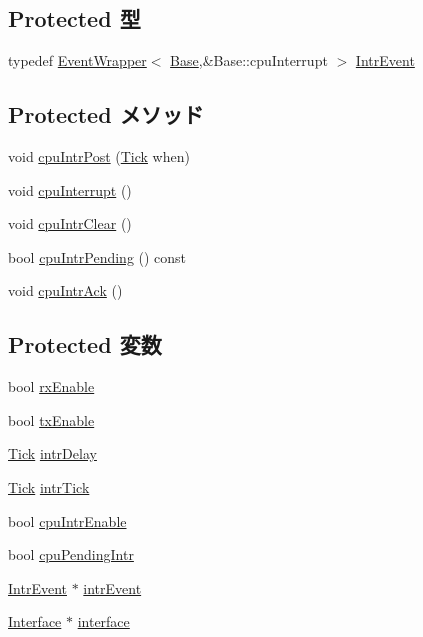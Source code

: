 \subsection*{Protected 型}
\begin{DoxyCompactItemize}
\item 
typedef \hyperlink{classEventWrapper}{EventWrapper}$<$ \hyperlink{classSinic_1_1Base}{Base},\&Base::cpuInterrupt $>$ \hyperlink{classSinic_1_1Base_a09f9d93e16b939356647836884f8f47f}{IntrEvent}
\end{DoxyCompactItemize}
\subsection*{Protected メソッド}
\begin{DoxyCompactItemize}
\item 
void \hyperlink{classSinic_1_1Base_af1fc872917f4ac5efa0d55c5c139bc9a}{cpuIntrPost} (\hyperlink{base_2types_8hh_a5c8ed81b7d238c9083e1037ba6d61643}{Tick} when)
\item 
void \hyperlink{classSinic_1_1Base_a6191ac616bb71f81aeb9a72898f5207f}{cpuInterrupt} ()
\item 
void \hyperlink{classSinic_1_1Base_ab1873826f52c78bed89f2ee53382a4c2}{cpuIntrClear} ()
\item 
bool \hyperlink{classSinic_1_1Base_a8f53e358ba260670dbc7296b35482316}{cpuIntrPending} () const 
\item 
void \hyperlink{classSinic_1_1Base_aa1dc801f063bc87ddb1cf8c618ec692e}{cpuIntrAck} ()
\end{DoxyCompactItemize}
\subsection*{Protected 変数}
\begin{DoxyCompactItemize}
\item 
bool \hyperlink{classSinic_1_1Base_a62cd12a758780749d1ed0ec4d4cfbe71}{rxEnable}
\item 
bool \hyperlink{classSinic_1_1Base_a950ab5d638f497b596eacdbf60bcb3f0}{txEnable}
\item 
\hyperlink{base_2types_8hh_a5c8ed81b7d238c9083e1037ba6d61643}{Tick} \hyperlink{classSinic_1_1Base_a2c0cc3d9993d1f77cdb0902bc5e257a9}{intrDelay}
\item 
\hyperlink{base_2types_8hh_a5c8ed81b7d238c9083e1037ba6d61643}{Tick} \hyperlink{classSinic_1_1Base_ad967cc729c22843df7961315b2fdab72}{intrTick}
\item 
bool \hyperlink{classSinic_1_1Base_a8bac804ce4074a5297817a10e2a11110}{cpuIntrEnable}
\item 
bool \hyperlink{classSinic_1_1Base_aa3e6b7b45f86d3fcd5565d6c960dbfa7}{cpuPendingIntr}
\item 
\hyperlink{classEventWrapper}{IntrEvent} $\ast$ \hyperlink{classSinic_1_1Base_a3839fcc574c7379ba7ec297aba0396e2}{intrEvent}
\item 
\hyperlink{classSinic_1_1Interface}{Interface} $\ast$ \hyperlink{classSinic_1_1Base_a98d75f7466a1c032c9ba46044c3ad05e}{interface}
\end{DoxyCompactItemize}
